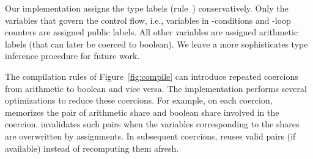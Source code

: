 Our implementation assigns the type labels (rule~{})
conservatively. Only the variables that govern the control flow, i.e.,
variables in -conditions and -loop counters are
assigned public labels.
All other variables are assigned arithmetic labels (that can later be
coerced to boolean).
We leave a more sophisticates type inference procedure for future work.


The compilation rules of Figure~\ref{fig:compile} can introduce
repeated coercions from arithmetic to
boolean and vice versa.
The \tool implementation performs several optimizations to reduce
these coercions.
For example, on each coercion, \tool memorizes the pair of arithmetic
share and boolean share involved in the coercion. 
\tool invalidates such pairs when the variables corresponding to the
shares are overwritten by assignments. 
In subsequent coercions, \tool  reuses valid pairs (if available)
instead of recomputing them afresh.

 

